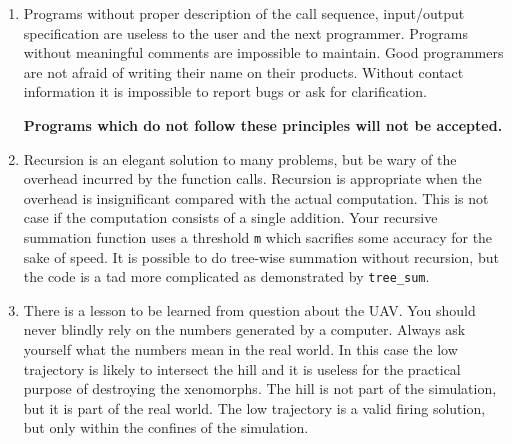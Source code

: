 \documentclass[a4paper,12pt]{article}
\newcounter{problem}
\newcounter{lesson}
\begin{document}
\begin{enumerate}

\item Programs without proper description of the call sequence, input/output specification are useless to the user and the next programmer. Programs without meaningful comments are impossible to maintain. Good programmers are not afraid of writing their name on their products. Without contact information it is impossible to report bugs or ask for clarification.
  \begin{center}
    {\bf Programs which do not follow these principles will not be accepted.}
  \end{center}

\item Recursion is an elegant solution to many problems, but be wary of the overhead incurred by the function calls. Recursion is appropriate when the overhead is insignificant compared with the actual computation. This is not case if the computation consists of a single addition. Your recursive summation function uses a threshold {\tt m} which sacrifies some accuracy for the sake of speed. It is possible to do tree-wise summation without recursion, but the code is a tad more complicated as demonstrated by {\tt tree\_sum}.

\item There is a lesson to be learned from question about the UAV. You should never blindly rely on the numbers generated by a computer. Always ask yourself what the numbers mean in the real world. In this case the low trajectory is likely to intersect the hill and it is useless for the practical purpose of destroying the xenomorphs. The hill is not part of the simulation, but it is part of the real world. The low trajectory is a valid firing solution, but only within the confines of the simulation.

\end{enumerate}


  
  
\end{document}
